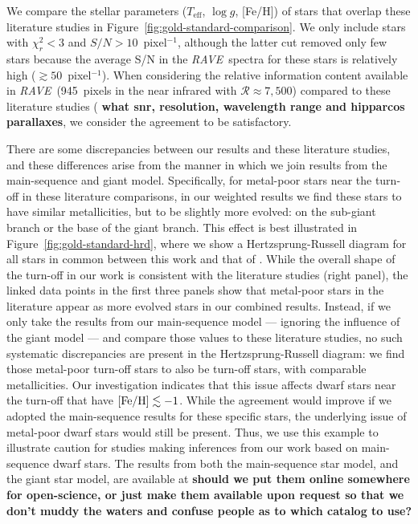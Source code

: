 \documentclass[preprint,trackchanges]{aastex}
\newcommand{\acronym}[1]{{\small{#1}}}
\newcommand{\project}[1]{\textsl{#1}}
\newcommand{\rave}{\project{\acronym{RAVE}}}
\newcommand{\stub}[1]{{\color{blue} \textbf{#1}}}
\newcommand{\teff}{T_{\mathrm{eff}}}
\newcommand{\logg}{\log g}
\begin{document}
We compare the stellar parameters ($\teff$, $\logg$, [Fe/H]) of stars that
overlap these literature studies in Figure~\ref{fig:gold-standard-comparison}.
We only include stars with $\chi_r^2 < 3$ and $S/N > 10$~pixel$^{-1}$, although the latter
cut removed only few stars because the average S/N in the \rave\ spectra for
these stars is relatively high ($\gtrsim{}50$~pixel$^{-1}$). When considering the relative 
information content available in \rave\ (945~pixels in the near infrared with
$\mathcal{R} \approx 7{,}500$) compared to these literature studies (\stub{what snr, resolution, wavelength range and hipparcos parallaxes}, we consider the
 agreement to be satisfactory.


There are some discrepancies between our results and these literature studies,
and these differences arise from the manner in which we join results from the
main-sequence and giant model.  Specifically, for metal-poor stars near
the turn-off in these literature comparisons, in our weighted results we find 
these stars to have similar metallicities, but to be slightly more evolved: 
on the sub-giant branch or the base of the giant branch.  This effect is best
illustrated in Figure~\ref{fig:gold-standard-hrd}, where we show a 
Hertzsprung-Russell diagram for all stars in common between this work and that
of \citet{Bensby_2014,Reddy_2003,Reddy_2006,Valenti_Fischer_2005}.  While the
overall shape of the turn-off in our work is consistent with the literature
studies (right panel), the linked data points in the first three panels show that metal-poor stars in the literature
appear as more evolved stars in our combined results.  Instead, if we only
take the results from our main-sequence model --- ignoring the influence of the
giant model --- and compare those values to these literature studies, no such 
systematic discrepancies are present in the Hertzsprung-Russell diagram: we 
find those metal-poor turn-off stars to also be turn-off stars, with comparable
metallicities.  Our investigation indicates that this issue affects dwarf stars
near the turn-off that have $[{\rm Fe/H}] \lesssim -1$.  While the agreement
would improve if we adopted the main-sequence results for these specific stars,
the underlying issue of metal-poor dwarf stars would still be present.  Thus,
we use this example to illustrate caution for studies making inferences from our
work based on main-sequence dwarf stars.  The results from both the main-sequence star model, 
and the giant star model, are available at \stub{should we put them online somewhere
for open-science, or just make them available upon request so that we don't
muddy the waters and confuse people as to which catalog to use?}
\end{document}
